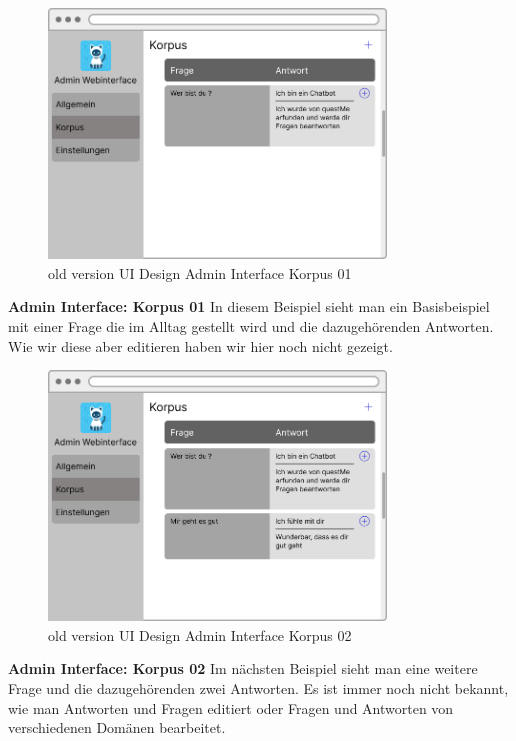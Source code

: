 \begin{figure}[H]
    \centering
    \includegraphics[width=0.8\textwidth]{bilder/old vers. UI Design/Admin Interface I.png}
    \caption{old version UI Design Admin Interface Korpus 01}
    \label{fig:old version UI Design Admin Interface Korpus 01}
    \end{figure}
\noindent \textbf{Admin Interface: Korpus 01} \newline
In diesem Beispiel sieht man ein Basisbeispiel mit einer Frage die im Alltag gestellt wird und die dazugehörenden Antworten. Wie wir diese aber
editieren haben wir hier noch nicht gezeigt.

\begin{figure}[H]
    \centering
    \includegraphics[width=0.8\textwidth]{bilder/old vers. UI Design/Admin Interface II.png}
    \caption{old version UI Design Admin Interface Korpus 02}
    \label{fig:old version UI Design Admin Interface Korpus 02}
    \end{figure}
\noindent \textbf{Admin Interface: Korpus 02} \newline
Im nächsten Beispiel sieht man eine weitere Frage und die dazugehörenden zwei Antworten. Es ist immer noch nicht
bekannt, wie man Antworten und Fragen editiert oder Fragen und Antworten von verschiedenen Domänen bearbeitet.

